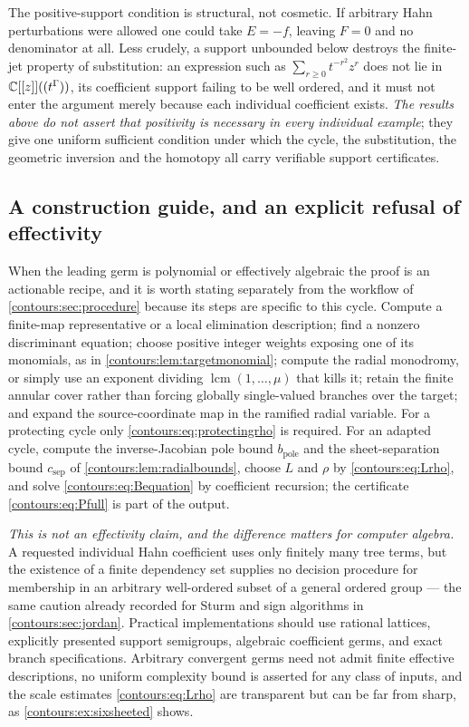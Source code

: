 \documentclass[11pt,letterpaper]{article}
\theoremstyle{definition}
\theoremstyle{remark}
\numberwithin{equation}{section}
\begin{document}
\begin{remark}
\label{contours:rem:positivityneeded}
The positive-support condition is structural, not cosmetic. If arbitrary Hahn
perturbations were allowed one could take $E=-f$, leaving $F=0$ and no
denominator at all. Less crudely, a support unbounded below destroys the
finite-jet property of substitution: an expression such as
$\sum_{r\ge0}t^{-r^2}z^r$ does not lie in $\mathbb C[[z]]((t^\Gamma))$, its coefficient
support failing to be well ordered, and it must not enter the argument merely
because each individual coefficient exists. \emph{The results above do not assert
that positivity is necessary in every individual example}; they give one uniform
sufficient condition under which the cycle, the substitution, the geometric
inversion and the homotopy all carry verifiable support certificates.
\end{remark}

\subsection{A construction guide, and an explicit refusal of effectivity}
\label{contours:subsec:construction}
When the leading germ is polynomial or effectively algebraic the proof is an
actionable recipe, and it is worth stating separately from the workflow of
\cref{contours:sec:procedure} because its steps are specific to this cycle.
Compute a finite-map representative or a local elimination description; find a
nonzero discriminant equation; choose positive integer weights exposing one of
its monomials, as in \cref{contours:lem:targetmonomial}; compute the radial
monodromy, or simply use an exponent dividing $\operatorname{lcm}(1,\ldots,\mu)$
that kills it; retain the finite annular cover rather than forcing globally
single-valued branches over the target; and expand the source-coordinate map in
the ramified radial variable. For a protecting cycle only
\eqref{contours:eq:protectingrho} is required. For an adapted cycle, compute the
inverse-Jacobian pole bound $b_{\mathrm{pole}}$ and the sheet-separation bound
$c_{\mathrm{sep}}$ of \cref{contours:lem:radialbounds}, choose $L$ and $\rho$ by
\eqref{contours:eq:Lrho}, and solve \eqref{contours:eq:Bequation} by coefficient
recursion; the certificate \eqref{contours:eq:Pfull} is part of the output.

\emph{This is not an effectivity claim, and the difference matters for computer
algebra.} A requested individual Hahn coefficient uses only finitely many tree
terms, but the existence of a finite dependency set supplies no decision
procedure for membership in an arbitrary well-ordered subset of a general
ordered group --- the same caution already recorded for Sturm and sign
algorithms in \cref{contours:sec:jordan}. Practical implementations should use
rational lattices, explicitly presented support semigroups, algebraic
coefficient germs, and exact branch specifications. Arbitrary convergent germs
need not admit finite effective descriptions, no uniform complexity bound is
asserted for any class of inputs, and the scale estimates \eqref{contours:eq:Lrho}
are transparent but can be far from sharp, as
\cref{contours:ex:sixsheeted} shows.
\end{document}
